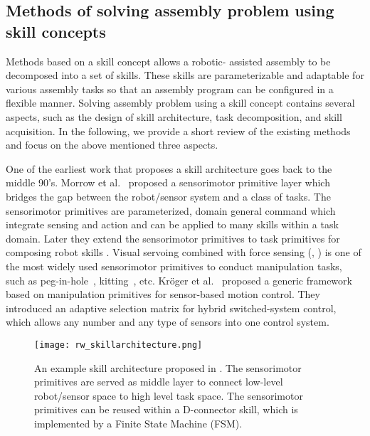 \subsection{Methods of solving assembly problem using skill concepts}
Methods based on a skill concept allows a robotic- assisted assembly to be decomposed into a set of skills. These skills are parameterizable and adaptable for various assembly tasks so that an assembly program can be configured in a flexible manner. Solving assembly problem using a skill concept contains several aspects, such as the design of skill architecture, task decomposition, and skill acquisition. In the following, we provide a short review of the existing methods and focus on the above mentioned three aspects.

One of the earliest work that proposes a skill architecture goes back to the middle 90's. Morrow et al.~\cite{Morrow1995} proposed a sensorimotor primitive layer which bridges the gap between the robot/sensor system and a class of tasks. The sensorimotor primitives are parameterized, domain general command which integrate sensing and action and can be applied to many skills within a task domain. Later they extend the sensorimotor primitives to task primitives for composing robot skills \cite{Morrow1997}. Visual servoing combined with force sensing (\cite{Nelson1996}, \cite{Lopez-Juarez2005}) is one of the most widely used sensorimotor primitives to conduct manipulation tasks, such as peg-in-hole~\cite{Brignone2002}, kitting~\cite{Holz2015}, etc. Kr\"oger et al.~\cite{Kroger2010} proposed a generic framework based on manipulation primitives for sensor-based motion control. They introduced an adaptive selection matrix for hybrid switched-system control, which allows any number and any type of sensors into one control system. 
\begin{figure}[!htbp]
\centering
\texttt{[image: rw\_skillarchitecture.png]}
\captionsetup{justification=raggedright}
\caption{An example skill architecture proposed in \cite{Morrow1995}. The sensorimotor primitives are served as middle layer to connect low-level robot/sensor space to high level task space. The sensorimotor primitives can be reused within a D-connector skill, which is implemented by a Finite State Machine (FSM). }
\label{fig:rw_skillarchitecture}       %
\end{figure} 

